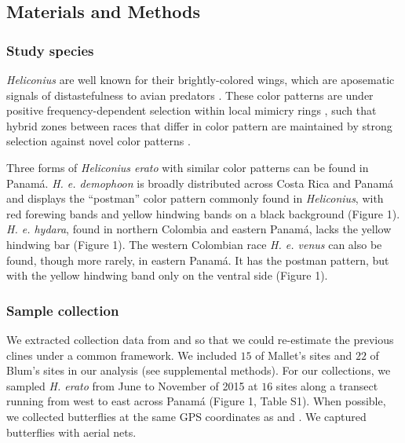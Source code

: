 \documentclass[]{article}
\begin{document}
\subsection{Materials and Methods}\label{materials-and-methods}

\subsubsection{Study species}\label{study-species}

\textit{Heliconius} are well known for their brightly-colored wings,
which are aposematic signals of distastefulness to avian predators
\citep{Supple:2014ff}. These color patterns are under positive
frequency-dependent selection within local mimicry rings
\citep{Merrill:2012gt, Chouteau:2016kk}, such that hybrid zones between
races that differ in color pattern are maintained by strong selection
against novel color patterns
\citep{Benson:1972hq, Mallet1989a, Kapan2001}.

Three forms of \textit{Heliconius erato} with similar color patterns can
be found in Panamá. \textit{H. e. demophoon} is broadly distributed
across Costa Rica and Panamá and displays the ``postman'' color pattern
commonly found in \textit{Heliconius}, with red forewing bands and
yellow hindwing bands on a black background (Figure 1).
\textit{H. e. hydara}, found in northern Colombia and eastern Panamá,
lacks the yellow hindwing bar (Figure 1). The western Colombian race
\textit{H. e. venus} can also be found, though more rarely, in eastern
Panamá. It has the postman pattern, but with the yellow hindwing band
only on the ventral side (Figure 1).

\subsubsection{Sample collection}\label{sample-collection}

We extracted collection data from \citet{Mallet:1986vj} and
\citet{Blum:2002wr} so that we could re-estimate the previous clines
under a common framework. We included \(15\) of Mallet's sites and
\(22\) of Blum's sites in our analysis (see supplemental methods). For
our collections, we sampled \textit{H. erato} from June to November of
2015 at \(16\) sites along a transect running from west to east across
Panamá (Figure 1, Table S1). When possible, we collected butterflies at
the same GPS coordinates as \citet{Mallet:1986vj} and
\citet{Blum:2002wr}. We captured butterflies with aerial nets.
\end{document}
